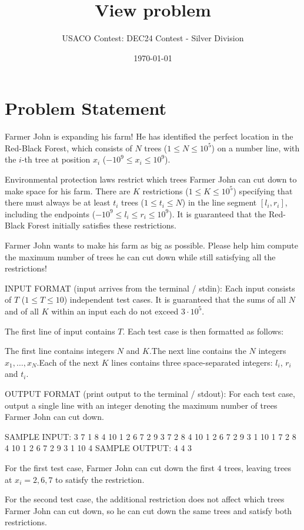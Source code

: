 \documentclass[12pt]{article}
\title{View problem}
\author{USACO Contest: DEC24 Contest - Silver Division}
\date{\today}
\begin{document}
\maketitle

\section*{Problem Statement}


Farmer John is expanding his farm! He has identified the perfect location in
the Red-Black Forest, which consists of $N$ trees ($1 \le N \le 10^5$) on a
number line, with the $i$-th tree at position $x_i$
($-10^9 \le x_i \le 10^9$).

Environmental protection laws restrict which trees Farmer John can
cut down to make space for his farm. There are $K$ restrictions ($1
\leq K \leq 10^5$) specifying that there must always be at least $t_i$
trees ($1 \leq t_i \leq N$) in the line segment $[l_i, r_i]$,
including the endpoints ($-10^9 \le l_i \leq r_i \le 10^9$). It is
guaranteed that the Red-Black Forest initially satisfies these
restrictions.

Farmer John wants to make his farm as big as possible. Please help him compute
the maximum number of trees he can cut down while still satisfying all the
restrictions!

INPUT FORMAT (input arrives from the terminal / stdin):
Each input consists of $T$ ($1 \le T \le 10$) independent test cases. It is
guaranteed that the sums of all $N$ and of all $K$ within an input each do not
exceed $3 \cdot 10^5$.

The first line of input contains $T$. Each test case is then formatted as
follows:

The first line contains integers $N$ and $K$.The next line
contains the $N$ integers $x_1, \dots, x_N$.Each of the next $K$ lines
contains three space-separated integers: $l_i$, $r_i$ and $t_i$.

OUTPUT FORMAT (print output to the terminal / stdout):
For each test case, output a single line with an integer denoting the maximum
number of trees Farmer John can cut down.


SAMPLE INPUT:
3
7 1
8 4 10 1 2 6 7
2 9 3
7 2
8 4 10 1 2 6 7
2 9 3
1 10 1
7 2
8 4 10 1 2 6 7
2 9 3
1 10 4
SAMPLE OUTPUT: 
4
4
3

For the first test case, Farmer John can cut down the first $4$ trees, leaving
trees at $x_i = 2, 6, 7$ to satisfy the restriction.

For the second test case, the additional restriction does not affect which trees
Farmer John can cut down, so he can cut down the same trees and satisfy both
restrictions.
\end{document}
